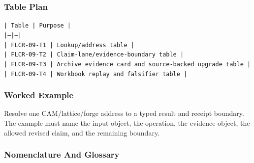 \documentclass[11pt]{article}
\begin{document}
\subsubsection*{Table Plan}

\noindent\texttt{| Table | Purpose |}\\
\noindent\texttt{|---|---|}\\
\noindent\texttt{| FLCR-09-T1 | Lookup/address table |}\\
\noindent\texttt{| FLCR-09-T2 | Claim-lane/evidence-boundary table |}\\
\noindent\texttt{| FLCR-09-T3 | Archive evidence card and source-backed upgrade table |}\\
\noindent\texttt{| FLCR-09-T4 | Workbook replay and falsifier table |}\\

\subsubsection*{Worked Example}

Resolve one CAM/lattice/forge address to a typed result and receipt boundary. The example must name the input object, the operation,
the evidence object, the allowed revised claim, and the remaining boundary.

\subsubsection*{Nomenclature And Glossary}
\end{document}
